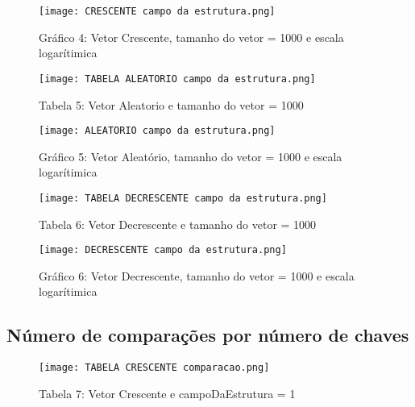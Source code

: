 \documentclass[a4paper, 12pt]{article}
\begin{document}
\begin{figure}[H] %
    \centering
    \texttt{[image: CRESCENTE campo da estrutura.png]}
    \captionsetup{labelformat=empty} %
    \caption{Gráfico 4: Vetor Crescente, tamanho do vetor = 1000 e escala logarítimica}
    \label{fig:exemplo}
\end{figure}

\begin{figure}[H] %
    \centering
    \texttt{[image: TABELA ALEATORIO campo da estrutura.png]}
    \captionsetup{labelformat=empty} %
    \caption{Tabela 5: Vetor Aleatorio e tamanho do vetor = 1000}
    \label{fig:exemplo}
\end{figure}

\begin{figure}[H] %
    \centering
    \texttt{[image: ALEATORIO campo da estrutura.png]}
    \captionsetup{labelformat=empty} %
    \caption{Gráfico 5: Vetor Aleatório, tamanho do vetor = 1000 e escala logarítimica}
    \label{fig:exemplo}
\end{figure}

\begin{figure}[H] %
    \centering
    \texttt{[image: TABELA DECRESCENTE campo da estrutura.png]}
    \captionsetup{labelformat=empty} %
    \caption{Tabela 6: Vetor Decrescente e tamanho do vetor = 1000}
    \label{fig:exemplo}
\end{figure}

\begin{figure}[H] %
    \centering
    \texttt{[image: DECRESCENTE campo da estrutura.png]}
    \captionsetup{labelformat=empty} %
    \caption{Gráfico 6: Vetor Decrescente, tamanho do vetor = 1000 e escala logarítimica}
    \label{fig:exemplo}
\end{figure}

\subsection{Número de comparações por número de chaves}

\begin{figure}[H] %
    \centering
    \texttt{[image: TABELA CRESCENTE comparacao.png]}
    \captionsetup{labelformat=empty} %
    \caption{Tabela 7: Vetor Crescente e campoDaEstrutura = 1}
    \label{fig:exemplo}
\end{figure}
\end{document}
